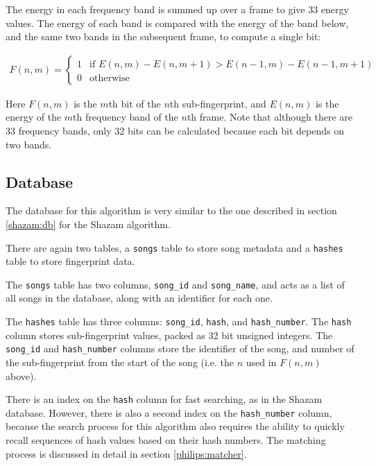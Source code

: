 \documentclass[12pt,a4paper,twoside,openright]{report}
\begin{document}
The energy in each frequency band is summed up over a frame to give 33 energy values. The energy of each band is compared with the energy of the band below, and the same two bands in the subsequent frame, to compute a single bit:

\begin{align*}
  F(n,m)=
  \begin{cases}
      1 & \text{if } E(n,m)-E(n,m+1) > E(n-1,m)-E(n-1,m+1)\\
      0 & \text{otherwise}
  \end{cases}
\end{align*}

Here $F(n,m)$ is the $m$th bit of the $n$th sub-fingerprint, and $E(n,m)$ is the energy of the $m$th frequency band of the $n$th frame. Note that although there are 33 frequency bands, only 32 bits can be calculated because each bit depends on two bands.


\subsection{Database}

The database for this algorithm is very similar to the one described in section \ref{shazam:db} for the Shazam algorithm.

There are again two tables, a \lstinline{songs} table to store song metadata and a \lstinline{hashes} table to store fingerprint data.

The \lstinline{songs} table has two columns, \lstinline{song_id} and \lstinline{song_name}, and acts as a list of all songs in the database, along with an identifier for each one.

The \lstinline{hashes} table has three columns: \lstinline{song_id}, \lstinline{hash}, and \lstinline{hash_number}. The \lstinline{hash} column stores sub-fingerprint values, packed as 32 bit unsigned integers. The \lstinline{song_id} and \lstinline{hash_number} columns store the identifier of the song, and number of the sub-fingerprint from the start of the song (i.e. the $n$ used in $F(n,m)$ above).

There is an index on the \lstinline{hash} column for fast searching, as in the Shazam database. However, there is also a second index on the \lstinline{hash_number} column, because the search process for this algorithm also requires the ability to quickly recall sequences of hash values based on their hash numbers. The matching process is discussed in detail in section \ref{philips:matcher}.
\end{document}
